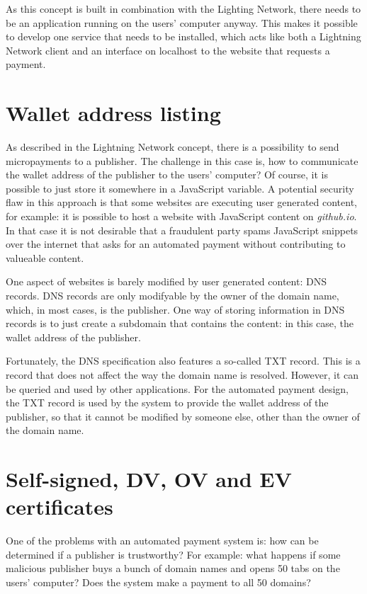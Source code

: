As this concept is built in combination with the Lighting Network, there needs to be an application running on the users' computer anyway. This makes it possible to develop one service that needs to be installed, which acts like both a Lightning Network client and an interface on localhost to the website that requests a payment.


\section{Wallet address listing}

As described in the Lightning Network concept, there is a possibility to send micropayments to a publisher. The challenge in this case is, how to communicate the wallet address of the publisher to the users' computer? Of course, it is possible to just store it somewhere in a JavaScript variable. A potential security flaw in this approach is that some websites are executing user generated content, for example: it is possible to host a website with JavaScript content on \textit{github.io}. In that case it is not desirable that a fraudulent party spams JavaScript snippets over the internet that asks for an automated payment without contributing to valueable content. 

One aspect of websites is barely modified by user generated content: DNS records. DNS records are only modifyable by the owner of the domain name, which, in most cases, is the publisher. One way of storing information in DNS records is to just create a subdomain that contains the content: in this case, the wallet address of the publisher. 

Fortunately, the DNS specification also features a so-called TXT record. This is a record that does not affect the way the domain name is resolved. However, it can be queried and used by other applications. For the automated payment design, the TXT record is used by the system to provide the wallet address of the publisher, so that it cannot be modified by someone else, other than the owner of the domain name. 

\section{Self-signed, DV, OV and EV certificates}

One of the problems with an automated payment system is: how can be determined if a publisher is trustworthy? For example: what happens if some malicious publisher buys a bunch of domain names and opens 50 tabs on the users' computer? Does the system make a payment to all 50 domains? 

